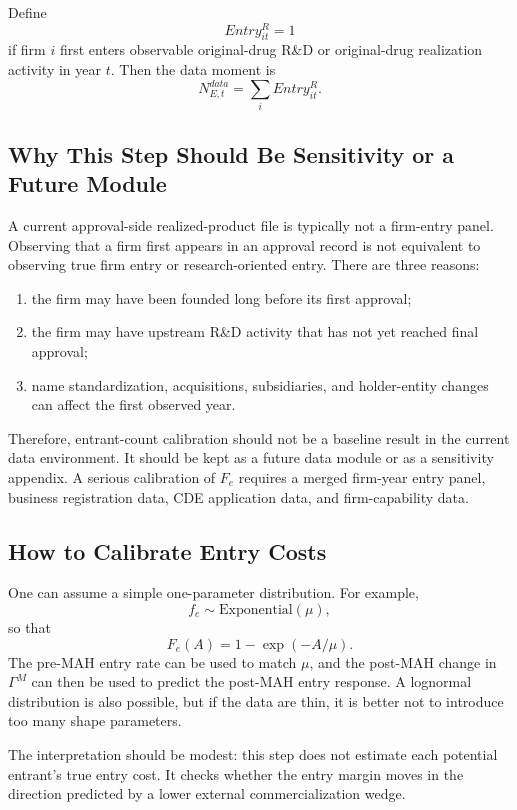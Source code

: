 \documentclass[12pt]{article}
\newcommand{\1}{\mathbf{1}}
\begin{document}
Define
\[
    Entry_{it}^{R}=1
\]
if firm $i$ first enters observable original-drug R\&D or original-drug realization activity in year $t$. Then the data moment is
\[
    N_{E,t}^{data}=\sum_i Entry_{it}^{R}.
\]

\subsection{Why This Step Should Be Sensitivity or a Future Module}

A current approval-side realized-product file is typically not a firm-entry panel. Observing that a firm first appears in an approval record is not equivalent to observing true firm entry or research-oriented entry. There are three reasons:
\begin{enumerate}[leftmargin=2em]
    \item the firm may have been founded long before its first approval;
    \item the firm may have upstream R\&D activity that has not yet reached final approval;
    \item name standardization, acquisitions, subsidiaries, and holder-entity changes can affect the first observed year.
\end{enumerate}

Therefore, entrant-count calibration should not be a baseline result in the current data environment. It should be kept as a future data module or as a sensitivity appendix. A serious calibration of $F_e$ requires a merged firm-year entry panel, business registration data, CDE application data, and firm-capability data.

\subsection{How to Calibrate Entry Costs}

One can assume a simple one-parameter distribution. For example,
\[
    f_e\sim \text{Exponential}(\mu),
\]
so that
\[
    F_e(A)=1-\exp(-A/\mu).
\]
The pre-MAH entry rate can be used to match $\mu$, and the post-MAH change in $\Gamma^M$ can then be used to predict the post-MAH entry response. A lognormal distribution is also possible, but if the data are thin, it is better not to introduce too many shape parameters.

The interpretation should be modest: this step does not estimate each potential entrant's true entry cost. It checks whether the entry margin moves in the direction predicted by a lower external commercialization wedge.
\end{document}
